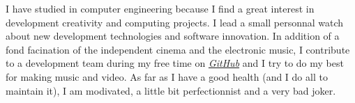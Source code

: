 I have studied in computer engineering because I find a great interest in development creativity and computing projects. I lead a small personnal watch about new development technologies and software innovation.
In addition of a fond facination of the independent cinema and the electronic music, I contribute to a development team during my free time on \href{https://github.com/team-chiru}{\textit{GitHub}} and I try to do my best for making music and video.
As far as I have a good health (and I do all to maintain it), I am modivated, a little bit perfectionnist and a very bad joker.
\vspace{.25em}
